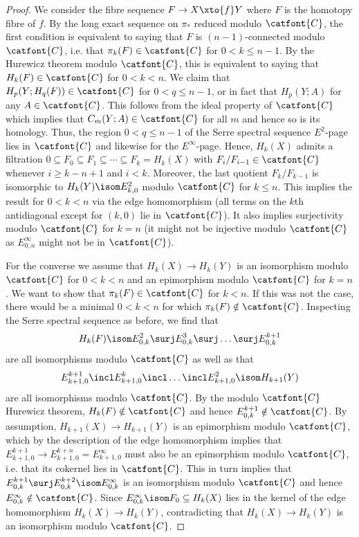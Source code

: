 \begin{proof}
	We consider the fibre sequence $F \to X \xto{f} Y$ where $F$ is the homotopy fibre of $f$.
	By the long exact sequence on $\pi_*$ reduced modulo $\catfont{C}$, the first condition is equivalent to saying that $F$ is $(n - 1)$-connected modulo $\catfont{C}$, i.e. that $\pi_k(F) \in \catfont{C}$ for $0 < k \leq n - 1$.
	By the Hurewicz theorem modulo $\catfont{C}$, this is equivalent to saying that $H_k(F) \in \catfont{C}$ for $0 < k < n$.
	We claim that $H_p(Y; H_q(F)) \in \catfont{C}$ for $0 < q \leq n - 1$, or in fact that $H_p(Y; A)$ for any $A \in \catfont{C}$.
	This follows from the ideal property of $\catfont{C}$ which implies that $C_m(Y; A) \in \catfont{C}$ for all $m$ and hence so is its homology.
	Thus, the region $0 < q \leq n - 1$ of the Serre spectral sequence $E^2$-page lies in $\catfont{C}$ and likewise for the $E^\infty$-page.
	Hence, $H_k(X)$ admits a filtration $0 \subseteq F_0 \subseteq F_1 \subseteq \cdots \subseteq F_k = H_k(X)$ with $F_i / F_{i - 1} \in \catfont{C}$ whenever $i \geq k - n + 1$ and $i < k$.
	Moreover, the last quotient $F_k / F_{k - 1}$ is isomorphic to $H_k(Y) \isom E^2_{k, 0}$ modulo $\catfont{C}$ for $k \leq n$.
	This implies the result for $0 < k < n$ via the edge homomorphism (all terms on the $k$th antidiagonal except for $(k, 0)$ lie in $\catfont{C}$).
	It also implies surjectivity modulo $\catfont{C}$ for $k = n$ (it might not be injective modulo $\catfont{C}$ as $E^\infty_{0, n}$ might not be in $\catfont{C}$).

	For the converse we assume that $H_k(X) \to H_k(Y)$ is an isomorphism modulo $\catfont{C}$ for $0 < k < n$ and an epimorphism modulo $\catfont{C}$ for $k = n$.
	We want to show that $\pi_k(F) \in \catfont{C}$ for $k < n$.
	If this was not the case, there would be a minimal $0 < k < n$ for which $\pi_k(F) \notin \catfont{C}$.
	Inspecting the Serre spectral sequence as before, we find that
	\begin{equation*}
		H_k(F) \isom E^2_{0, k} \surj E^3_{0, k} \surj \ldots \surj E^{k + 1}_{0, k}
	\end{equation*}
	are all isomorphisms modulo $\catfont{C}$ as well as that
	\begin{equation*}
		E^{k + 1}_{k + 1, 0} \incl E^k_{k + 1, 0} \incl \ldots \incl E^2_{k + 1, 0} \isom H_{k + 1}(Y)
	\end{equation*}
	are all isomorphisms modulo $\catfont{C}$.
	By the modulo $\catfont{C}$ Hurewicz theorem, $H_k(F) \notin \catfont{C}$ and hence $E^{k + 1}_{0, k} \notin \catfont{C}$.
	By assumption, $H_{k + 1}(X) \to H_{k + 1}(Y)$ is an epimorphism modulo $\catfont{C}$, which by the description of the edge homomorphism implies that $E^{k + 1}_{k + 1, 0} \to E^{k + n}_{k + 1, 0} = E^\infty_{k + 1, 0}$ must also be an epimorphism modulo $\catfont{C}$, i.e. that its cokernel lies in $\catfont{C}$.
	This in turn implies that $E^{k + 1}_{0, k} \surj E^{k + 2}_{0, k} \isom E^\infty_{0, k}$ is an isomorphism modulo $\catfont{C}$ and hence $E^\infty_{0, k} \notin \catfont{C}$.
	Since $E^\infty_{0, k} \isom F_0 \subseteq H_k(X)$ lies in the kernel of the edge homomorphism $H_k(X) \to H_k(Y)$, contradicting that $H_k(X) \to H_k(Y)$ is an isomorphism modulo $\catfont{C}$.
\end{proof}
